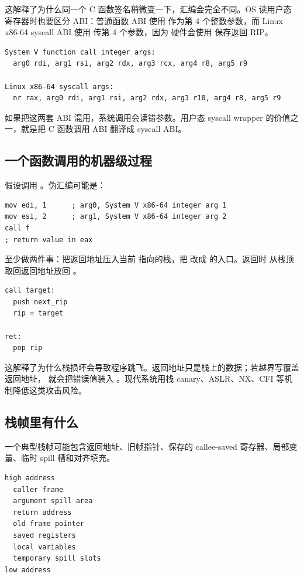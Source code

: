 这解释了为什么同一个 C 函数签名稍微变一下，汇编会完全不同。OS 读用户态寄存器时也要区分 ABI：普通函数 ABI 使用  作为第 4 个整数参数，而 Linux x86-64 syscall ABI 使用  传第 4 个参数，因为  硬件会使用  保存返回 RIP。

\begin{lstlisting}
System V function call integer args:
  arg0 rdi, arg1 rsi, arg2 rdx, arg3 rcx, arg4 r8, arg5 r9

Linux x86-64 syscall args:
  nr rax, arg0 rdi, arg1 rsi, arg2 rdx, arg3 r10, arg4 r8, arg5 r9
\end{lstlisting}

如果把这两套 ABI 混用，系统调用会读错参数。用户态 syscall wrapper 的价值之一，就是把 C 函数调用 ABI 翻译成 syscall ABI。

\subsection{一个函数调用的机器级过程}

假设调用 。伪汇编可能是：

\begin{lstlisting}
mov edi, 1      ; arg0, System V x86-64 integer arg 1
mov esi, 2      ; arg1, System V x86-64 integer arg 2
call f
; return value in eax
\end{lstlisting}

 至少做两件事：把返回地址压入当前  指向的栈，把  改成  的入口。返回时  从栈顶取回返回地址放回 。

\begin{lstlisting}
call target:
  push next_rip
  rip = target

ret:
  pop rip
\end{lstlisting}

这解释了为什么栈损坏会导致程序跳飞。返回地址只是栈上的数据；若越界写覆盖返回地址， 就会把错误值装入 。现代系统用栈 canary、ASLR、NX、CFI 等机制降低这类攻击风险。

\subsection{栈帧里有什么}

一个典型栈帧可能包含返回地址、旧帧指针、保存的 callee-saved 寄存器、局部变量、临时 spill 槽和对齐填充。

\begin{lstlisting}
high address
  caller frame
  argument spill area
  return address
  old frame pointer
  saved registers
  local variables
  temporary spill slots
low address
\end{lstlisting}


